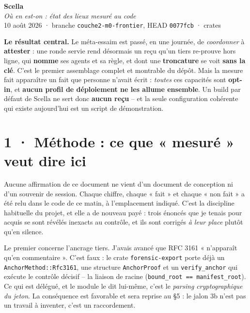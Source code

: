 \documentclass[10pt]{article}
\newcommand{\code}[1]{\texttt{\small #1}}
\begin{document}
\begin{center}
{\Huge\bfseries\color{navy} Scella}\\[4pt]
{\large\color{grey}\itshape Où en est-on : état des lieux mesuré au code}\\[4pt]
{\small\color{grey} 10 août 2026 \; · \; branche \code{couche2-m0-frontier}, HEAD \code{0077fcb} \; ·  crates}
\end{center}
\vspace{2pt}

\begin{these}
\textbf{Le résultat central.} Le méta-essaim est passé, en une journée, de \emph{coordonner} à
\textbf{attester} : une ronde servie rend désormais un reçu qu'un tiers re-prouve hors ligne, qui
\textbf{nomme} ses agents et sa règle, et dont une \textbf{troncature} se voit \textbf{sans la clé}.
C'est le premier assemblage complet et montrable du dépôt. Mais la mesure fait apparaître un fait que
personne n'avait écrit : \emph{toutes} ces capacités sont \textbf{opt-in}, et \textbf{aucun profil de
déploiement ne les allume ensemble}. Un build par défaut de Scella ne sert donc \textbf{aucun reçu} --
et la seule configuration cohérente qui existe aujourd'hui est un script de démonstration.
\end{these}

\section{1 · Méthode : ce que « mesuré » veut dire ici}

Aucune affirmation de ce document ne vient d'un document de conception ni d'un souvenir de session.
Chaque chiffre, chaque « fait » et chaque « non fait » a été relu dans le code de ce matin, à
l'emplacement indiqué. C'est la discipline habituelle du projet, et elle a de nouveau payé : trois
énoncés que je tenais pour acquis se sont révélés inexacts au contrôle, et ils sont corrigés
\emph{à leur place} plutôt qu'en silence.

Le premier concerne l'ancrage tiers. J'avais avancé que RFC 3161 « n'apparaît qu'en commentaire ».
C'est faux : le crate \code{forensic-export} porte déjà un \code{AnchorMethod::Rfc3161}, une structure
\code{AnchorProof} et un \code{verify\_anchor} qui exécute le contrôle décisif -- la liaison de racine
(\code{bound\_root == manifest\_root}). Ce qui est délégué, et le module le dit lui-même, c'est le
\emph{parsing cryptographique du jeton}. La conséquence est favorable et sera reprise au §5 : le jalon
3b n'est pas un travail à inventer, c'est un raccordement.
\end{document}
